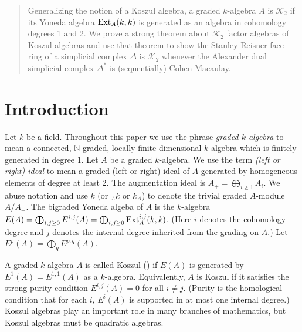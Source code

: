 \documentclass[11pt,righttag]{amsart}
\begin{document}
\setcounter{page}{1}

\thispagestyle{empty}

\vspace{0.2in}

\begin{abstract}
\baselineskip15pt

Generalizing the notion of a Koszul algebra, a graded $k$-algebra $A$ is ${{\mathcal K}}_2$ if its Yoneda algebra ${\hbox{{\rm Ext}}}_A(k,k)$ is generated as an algebra in cohomology degrees 1 and 2.  We prove a strong theorem about ${{\mathcal K}}_2$ factor algebras of Koszul algebras and use that theorem to show  the Stanley-Reisner face ring of a simplicial complex ${\Delta}$ is ${{\mathcal K}}_2$ whenever the Alexander dual simplicial complex ${\Delta}^*$ is (sequentially) Cohen-Macaulay.

\end{abstract}

\bigskip

\baselineskip18pt

\section{Introduction}

Let $k$ be a field.  Throughout this paper we use the phrase \emph{graded $k$-algebra} to mean a connected, ${{\mathbb N}}$-graded, locally finite-dimensional $k$-algebra which is finitely generated in degree 1.  Let $A$ be a graded $k$-algebra. We use the term \emph{(left or right) ideal} to mean a graded (left or right) ideal of $A$ generated by homogeneous elements of degree at least 2. The augmentation ideal is $A_+=\bigoplus_{i\ge 1} A_i$. We abuse notation and use $k$ (or $_Ak$ or $k_A$) to denote the trivial graded $A$-module $A/A_+$. The bigraded Yoneda algeba of $A$ is  the $k$-algebra $E(A) = \bigoplus_{i,j\ge 0} E^{i,j}(A) = \bigoplus_{i,j\ge 0} {\hbox{{\rm Ext}}}^{i,j}_A(k,k)$. (Here $i$ denotes the cohomology degree and $j$ denotes the internal degree inherited from the grading on $A$.) Let $E^p(A)=\bigoplus_{q} E^{p,q}(A)$.

A graded $k$-algebra $A$ is called Koszul (\cite{Priddy}) if $E(A) $ is generated by $E^1(A) = E^{1,1}(A)$ as a $k$-algebra. Equivalently, $A$ is Koszul if it satisfies the strong purity condition $E^{i,j}(A) = 0$ for all $i\ne j$. (Purity is the homological condition that for each $i$, $E^i(A)$ is supported in at most one internal degree.) Koszul algebras play an important role in many branches of mathematics, but Koszul algebras must be quadratic algebras.  
\end{document}
